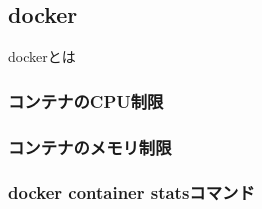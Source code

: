 \documentclass[../../../main]{subfiles}
\begin{document}
    \subsection{docker}\label{subsec:phraseology-docker}

    dockerとは

    \subsubsection{コンテナのCPU制限}\label{subsubsec:phraseology-docker-cpu-limit}
    \subsubsection{コンテナのメモリ制限}\label{subsubsec:phraseology-docker-memory-limit}
    \subsubsection{docker container statsコマンド}\label{subsubsec:phraseology-docker-container-stats}
\end{document}
